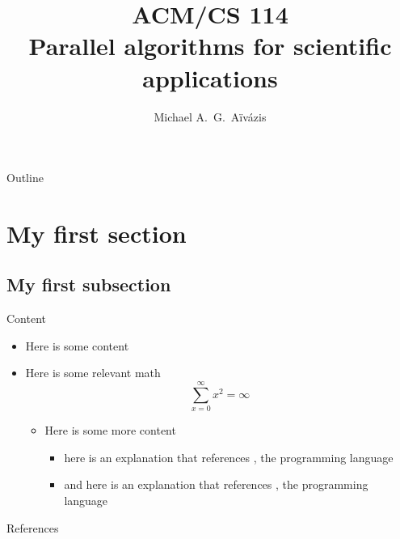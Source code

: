 \documentclass{beamer}
\title[ACM/CS 114]{ACM/CS 114 \\ Parallel algorithms for scientific applications}
\author{Michael A.~G.~A\"iv\'azis}
\institute{California Institute of Technology}
\begin{document}
\begin{frame}
  \titlepage
\end{frame}

\begin{frame}{Outline}
  \tableofcontents
\end{frame}

\section{My first section}
\subsection{My first subsection}

\begin{frame}{Content}
  \begin{itemize}
  \item Here is some content

  \item
    Here is some relevant math
    \[ \sum_{x=0}^{\infty} x^{2} = \infty \]

    \begin{itemize}
    \item Here is some more content
      \begin{itemize}
      \item here is an explanation that references \cite{icon}, the
        programming language
      \item and here is an explanation that references \cite{python-doc}, the
        programming language
      \end{itemize}
    \end{itemize}
    
  \end{itemize}

\end{frame}

\begin{frame}{References}


\end{frame}
\end{document}
